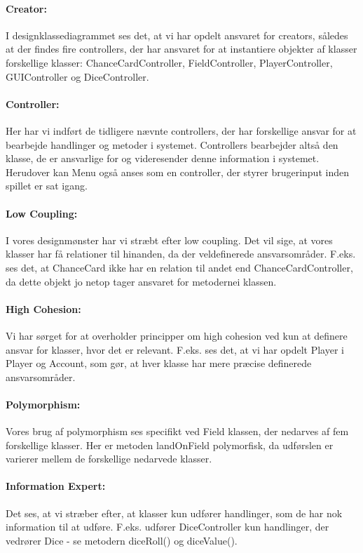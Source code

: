\begin{flushleft}
\paragraph*{Creator:} I designklassediagrammet ses det, at vi har opdelt ansvaret for creators, således at der findes fire controllers, der har ansvaret for at instantiere objekter af klasser forskellige klasser: ChanceCardController, FieldController, PlayerController, GUIController og DiceController.

\paragraph*{Controller:}
Her har vi indført de tidligere nævnte controllers, der har forskellige ansvar for at bearbejde handlinger og metoder i systemet. Controllers bearbejder altså den klasse, de er ansvarlige for og videresender denne information i systemet. Herudover kan Menu også anses som en controller, der styrer brugerinput inden spillet er sat igang.

\paragraph*{Low Coupling:}
I vores designmønster har vi stræbt efter low coupling. Det vil sige, at vores klasser har få relationer til hinanden, da der veldefinerede ansvarsområder. F.eks. ses det, at ChanceCard ikke har en relation til andet end ChanceCardController, da dette objekt jo netop tager ansvaret for metodernei klassen.

\paragraph*{High Cohesion:}
Vi har sørget for at overholder principper om high cohesion ved kun at definere ansvar for klasser, hvor det er relevant. F.eks. ses det, at vi har opdelt Player i Player og Account, som gør, at hver klasse har mere præcise definerede ansvarsområder.

\paragraph*{Polymorphism:}
Vores brug af polymorphism ses specifikt ved Field klassen, der nedarves af fem forskellige klasser. Her er metoden landOnField polymorfisk, da udførslen er varierer mellem de forskellige nedarvede klasser.

\paragraph*{Information Expert:}
Det ses, at vi stræber efter, at klasser kun udfører handlinger, som de har nok information til at udføre. F.eks. udfører DiceController kun handlinger, der vedrører Dice - se metodern diceRoll() og diceValue().


\end{flushleft}
